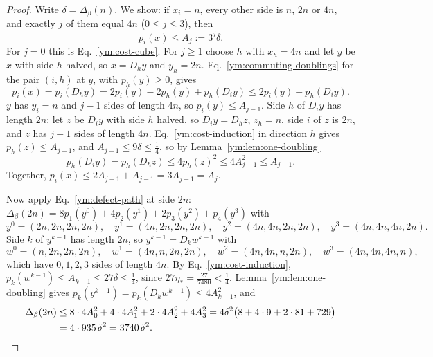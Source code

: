 \begin{proof}
Write $\delta=\Delta_\beta(n)$. We show: if $x_i=n$, every other side is $n$,
$2n$ or $4n$, and exactly $j$ of them equal $4n$ ($0\le j\le3$), then
\begin{equation}\label{ym:cost-induction}
 p_i(x)\le A_j:=3^j\delta .
\end{equation}
For $j=0$ this is Eq.~\eqref{ym:cost-cube}. For $j\ge1$ choose $h$ with
$x_h=4n$ and let $y$ be $x$ with side $h$ halved, so $x=D_hy$ and $y_h=2n$.
Eq.~\eqref{ym:commuting-doublings} for the pair $(i,h)$ at $y$, with
$p_h(y)\ge0$, gives
\begin{equation}
 p_i(x)=p_i(D_hy)=2p_i(y)-2p_h(y)+p_h(D_iy)\le2p_i(y)+p_h(D_iy).
\end{equation}
$y$ has $y_i=n$ and $j-1$ sides of length $4n$, so $p_i(y)\le A_{j-1}$. Side
$h$ of $D_iy$ has length $2n$; let $z$ be $D_iy$ with side $h$ halved, so
$D_iy=D_hz$, $z_h=n$, side $i$ of $z$ is $2n$, and $z$ has $j-1$ sides of
length $4n$. Eq.~\eqref{ym:cost-induction} in direction $h$ gives
$p_h(z)\le A_{j-1}$, and $A_{j-1}\le9\delta\le\frac14$, so by
Lemma~\ref{ym:lem:one-doubling}
\begin{equation}
 p_h(D_iy)=p_h(D_hz)\le4p_h(z)^2\le4A_{j-1}^2\le A_{j-1}.
\end{equation}
Together, $p_i(x)\le2A_{j-1}+A_{j-1}=3A_{j-1}=A_j$.

Now apply Eq.~\eqref{ym:defect-path} at side $2n$:
$\Delta_\beta(2n)=8p_1(y^0)+4p_2(y^1)+2p_3(y^2)+p_4(y^3)$ with
\begin{equation}
 y^0=(2n,2n,2n,2n),\quad y^1=(4n,2n,2n,2n),\quad y^2=(4n,4n,2n,2n),\quad
 y^3=(4n,4n,4n,2n).
\end{equation}
Side $k$ of $y^{k-1}$ has length $2n$, so $y^{k-1}=D_kw^{k-1}$ with
\begin{equation}
 w^0=(n,2n,2n,2n),\quad w^1=(4n,n,2n,2n),\quad w^2=(4n,4n,n,2n),\quad
 w^3=(4n,4n,4n,n),
\end{equation}
which have $0,1,2,3$ sides of length $4n$. By Eq.~\eqref{ym:cost-induction},
$p_k(w^{k-1})\le A_{k-1}\le27\delta\le\frac14$, since
$27\eta_*=\frac{27}{7480}<\frac14$. Lemma~\ref{ym:lem:one-doubling} gives
$p_k(y^{k-1})=p_k(D_kw^{k-1})\le4A_{k-1}^2$, and
\begin{align}
 \Delta_\beta(2n)&\le8\cdot4A_0^2+4\cdot4A_1^2+2\cdot4A_2^2+4A_3^2
 =4\delta^2\big(8+4\cdot9+2\cdot81+729\big)\notag\\
 &=4\cdot935\,\delta^2=3740\,\delta^2 .
\end{align}
\end{proof}
